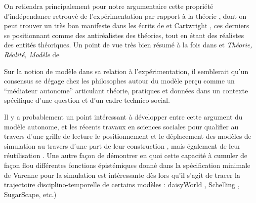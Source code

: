 
On retiendra principalement pour notre argumentaire cette propriété d'indépendance retrouvé de l'expérimentation par rapport à la théorie , dont on peut trouver un très bon manifeste dans les écrits de \textcite{Hacking1989} et Cartwright , ces derniers se positionnant comme des antiréalistes des théories, tout en étant des réalistes des entités théoriques. Un point de vue très bien résumé à la fois dans \textcite{Hacking1989} et \textit{Théorie, Réalité, Modèle} de \textcite[226-231]{Varenne2012}

Sur la notion de modèle dans sa relation à l'expérimentation, il semblerait qu'un consensus se dégage chez les philosophes \autocites{Morgan2009, Varenne2013} autour du modèle perçu comme un \enquote{médiateur autonome} articulant théorie, pratiques et données dans un contexte spécifique d'une question et d'un cadre technico-social. \autocite[2]{Phan2010}

Il y a probablement un point intéressant à développer entre cette argument du modèle autonome, et les récents travaux en sciences sociales pour qualifier au travers d'une grille de lecture \autocites{Banos2013a, Sanders2013} le positionnement \autocites{Banos2013, Schmitt2013} et le déplacement des modèles de simulation au travers d'une part de leur construction \autocite{Cottineau2014b}, mais également de leur réutilisation \autocite{Schmitt2014}. Une autre façon de démontrer en quoi cette capacité à cumuler de façon flou différentes fonctions épistémiques donné dans la spécification minimale de Varenne pour la simulation \autocite{Varenne2013} est intéressante dès lors qu'il s'agit de tracer la trajectoire disciplino-temporelle de certains modèles : daisyWorld \autocite{Dutreuil2013}, Schelling \autocite {Bulle2005}, SugarScape, etc.)

